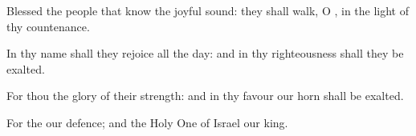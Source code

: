 {\Q {}Blessed
{} the
people that
know the joyful
sound: they shall
walk, O
{}, in the
light of thy
countenance.


\par }{\Q {}In thy
name shall they
rejoice all the
day: and in thy
righteousness shall they be
exalted.


\par }{\Q {}For thou
{} the
glory of their
strength: and in thy
favour our
horn shall be
exalted.


\par }{\Q {}For the
{}
{} our
defence; and the Holy
One of
Israel
{} our
king.


\par }{\BB \par }
